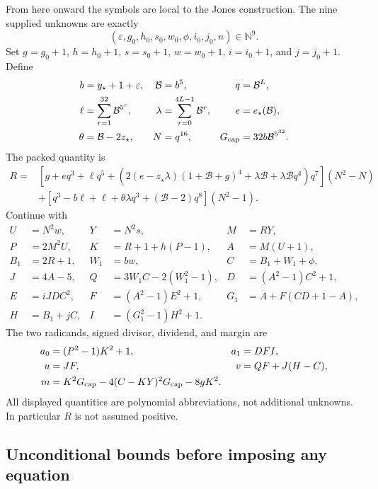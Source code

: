From here onward the symbols are local to the Jones construction. The
nine supplied unknowns are exactly
\[
 (\varepsilon,g_0,h_0,s_0,w_0,\phi,i_0,j_0,n)\in\mathbb N^9.
\]
Set $g=g_0+1$, $h=h_0+1$, $s=s_0+1$, $w=w_0+1$,
$i=i_0+1$, and $j=j_0+1$. Define
\begin{align*}
 b&=y_\star+1+\varepsilon,&\mathcal B&=b^5,&q&=\mathcal B^L,\\
 \ell&=\sum_{r=1}^{32}\mathcal B^{5^r},&
 \lambda&=\sum_{r=0}^{4L-1}\mathcal B^r,&e&=e_\star(\mathcal B),\\
 \theta&=\mathcal B-2z_\star,&N&=q^{16},&
 G_{\rm cap}&=32b\mathcal B^{5^{32}}.
\end{align*}
The packed quantity is
\begin{align*}
R={}&\left[g+eq^3+\ell q^5+
 \left(2(e-z_\star\lambda)(1+\mathcal B+g)^4
       +\lambda\mathcal B+\lambda\mathcal Bq^4\right)q^7\right](N^2-N)\\
 &+\left[q^3-b\ell+\ell+\theta\lambda q^3+
                   (\mathcal B-2)q^8\right](N^2-1).
\end{align*}
Continue with
\begin{align*}
 U&=N^2w,&Y&=N^2s,&M&=RY,\\
 P&=2M^2U,&K&=R+1+h(P-1),&A&=M(U+1),\\
 B_1&=2R+1,&W_1&=bw,&C&=B_1+W_1+\phi,\\
 J&=4A-5,&Q&=3W_1C-2(W_1^2-1),&D&=(A^2-1)C^2+1,\\
 E&=iJDC^2,&F&=(A^2-1)E^2+1,&G_1&=A+F(CD+1-A),\\
 H&=B_1+jC,&I&=(G_1^2-1)H^2+1.&
\end{align*}
The two radicands, signed divisor, dividend, and margin are
\begin{align*}
 a_0&=(P^2-1)K^2+1,&a_1&=DFI,\\
 u&=JF,&v&=QF+J(H-C),\\
 m&=K^2G_{\rm cap}-4(C-KY)^2G_{\rm cap}-8gK^2.
\end{align*}
All displayed quantities are polynomial abbreviations, not additional
unknowns. In particular $R$ is not assumed positive.

\subsection{Unconditional bounds before imposing any equation}

